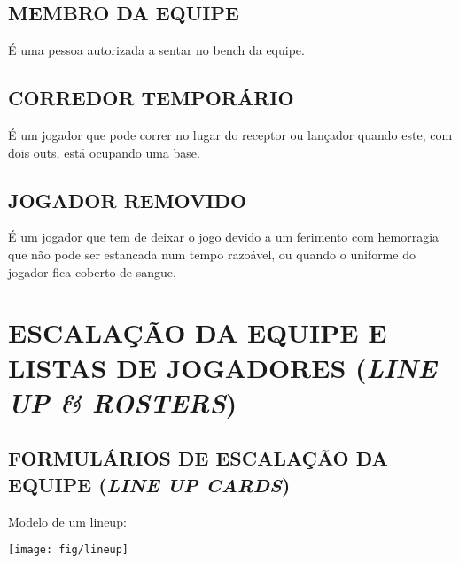 \subsection{MEMBRO DA EQUIPE}
É uma pessoa autorizada a sentar no \gls{bench} da equipe.
\subsection{CORREDOR TEMPORÁRIO}
\begin{mdframed}[hidealllines=true,backgroundcolor=blue!20]
	É um jogador que pode correr no lugar do receptor ou lançador quando este, com dois \glspl{out}, está ocupando uma base.
\end{mdframed}
\subsection{JOGADOR REMOVIDO}

É um jogador que tem de deixar o jogo devido a um ferimento com hemorragia que não pode ser estancada num tempo razoável, ou quando o uniforme do jogador fica coberto de sangue.

\section{ESCALAÇÃO DA EQUIPE E LISTAS DE JOGADORES (\textit{LINE UP \& ROSTERS})}
\subsection{FORMULÁRIOS DE ESCALAÇÃO DA EQUIPE (\textit{LINE UP CARDS})}\label{ssec:Preencherlineup}

Modelo de um \gls{lineup}:

\begin{center}
	\texttt{[image: fig/lineup]}
\end{center}

